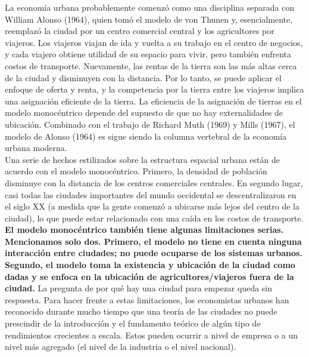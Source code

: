 La economía urbana probablemente comenzó como una disciplina separada con William Alonso (1964), quien tomó el modelo de von Thunen y, esencialmente, reemplazó la ciudad por un centro comercial central y los agricultores por viajeros. Los viajeros viajan de ida y vuelta a su trabajo en el centro de negocios, y cada viajero obtiene utilidad de su espacio para vivir, pero también enfrenta costos de transporte. Nuevamente, las rentas de la tierra son las más altas cerca de la ciudad y disminuyen con la distancia. Por lo tanto, se puede aplicar el enfoque de oferta y renta, y la competencia por la tierra entre los viajeros implica una asignación eficiente de la tierra. La eficiencia de la asignación de tierras en el modelo monocéntrico depende del supuesto de que no hay externalidades de ubicación. Combinado con el trabajo de Richard Muth (1969) y Mills (1967), el modelo de Alonso (1964) es sigue siendo la columna vertebral de la economía urbana moderna.\\
Una serie de hechos estilizados sobre la estructura espacial urbana están de acuerdo con el modelo monocéntrico. Primero, la densidad de población disminuye con la distancia de los centros comerciales centrales. En segundo lugar, casi todas las ciudades importantes del mundo occidental se descentralizaron en el siglo XX (a medida que la gente comenzó a ubicarse más lejos del centro de la ciudad), lo que puede estar relacionado con una caída en los costos de transporte. \textbf{El modelo monocéntrico también tiene algunas limitaciones serias. Mencionamos solo dos. Primero, el modelo no tiene en cuenta ninguna interacción entre ciudades; no puede ocuparse de los sistemas urbanos. Segundo, el modelo toma la existencia y ubicación de la ciudad como dadas y se enfoca en la ubicación de agricultores/viajeros fuera de la ciudad.} La pregunta de por qué hay una ciudad para empezar queda sin respuesta. Para hacer frente a estas limitaciones, los economistas urbanos han reconocido durante mucho tiempo que una teoría de las ciudades no puede prescindir de la introducción y el fundamento teórico de algún tipo de rendimientos crecientes a escala. Estos pueden ocurrir a nivel de empresa o a un nivel más agregado (el nivel de la industria o el nivel nacional). 

